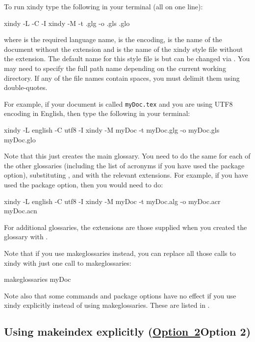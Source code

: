 \documentclass[report,inlinetitle]{nlctdoc}
\newcommand*{\opt}[1]{\hyperlink{option#1}{Option~#1}}
\begin{document}
To run \gls{xindy} type the following in your terminal 
(all on one line):
\begin{prompt}
xindy -L  -C  -I xindy -M  -t .glg -o .gls .glo
\end{prompt}
where  is the required language name, 
is the encoding,  is the name of the document without the
 extension and  is the name of the
\gls{xindy} style file without the  extension.
The default name for this style file is 
but can be changed via . You may need
to specify the full path name depending on the current working
directory. If any of the file names contain spaces, you must delimit
them using double-quotes.

For example, if your document is called \texttt{myDoc.tex} and
you are using UTF8 encoding in English, then type the
following in your terminal:
\begin{prompt}
xindy -L english -C utf8 -I xindy -M myDoc -t myDoc.glg -o myDoc.gls myDoc.glo
\end{prompt}

Note that this just creates the main glossary. You need to do
the same for each of the other glossaries (including the
list of acronyms if you have used the 
package option), substituting , 
and  with the relevant extensions. For example,
if you have used the  package option, then 
you would need to do:
\begin{prompt}
xindy -L english -C utf8 -I xindy -M myDoc -t myDoc.alg -o myDoc.acr myDoc.acn
\end{prompt}
For additional glossaries, the extensions are those supplied
when you created the glossary with .

Note that if you use \gls{makeglossaries} instead, you can
replace all those calls to \gls{xindy} with just one call
to \gls*{makeglossaries}:
\begin{prompt}
makeglossaries myDoc
\end{prompt}
Note also that some commands and package options have no effect if 
you use \gls{xindy} explicitly instead of using 
\gls*{makeglossaries}. These are listed in 
.


\subsection[Using makeindex explicitly (Option~2)]{Using
\gls{makeindex} explicitly (\ifpdf \opt2\else Option 2\fi)}
\label{sec:makeindexapp}
\end{document}
